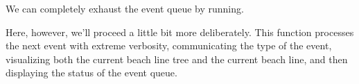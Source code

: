 \documentclass[
  letterpaper,
  DIV=11,
  numbers=noendperiod]{scrartcl}
\newenvironment{Shaded}{\begin{snugshade}}{\end{snugshade}}
\newcommand{\ControlFlowTok}[1]{\textcolor[rgb]{0.00,0.23,0.31}{#1}}
\newcommand{\FunctionTok}[1]{\textcolor[rgb]{0.28,0.35,0.67}{#1}}
\newcommand{\NormalTok}[1]{\textcolor[rgb]{0.00,0.23,0.31}{#1}}
\newcommand{\SpecialCharTok}[1]{\textcolor[rgb]{0.37,0.37,0.37}{#1}}
\begin{document}
We can completely exhaust the event queue by running.

\begin{Shaded}
\end{Shaded}

Here, however, we'll proceed a little bit more deliberately. This
function processes the next event with extreme verbosity, communicating
the type of the event, visualizing both the current beach line tree and
the current beach line, and then displaying the status of the event
queue.
\end{document}
